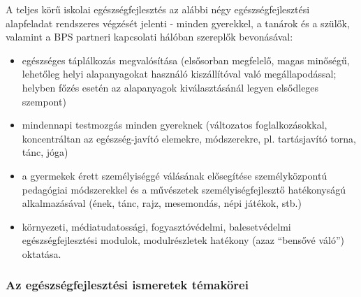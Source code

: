 A teljes körű iskolai egészségfejlesztés az alábbi négy
egészségfejlesztési alapfeladat rendszeres végzését jelenti - minden
gyerekkel, a tanárok és a szülők, valamint a BPS partneri kapcsolati
hálóban szereplők bevonásával:

\begin{itemize}

\item
  egészséges táplálkozás megvalósítása (elsősorban megfelelő, magas
  minőségű, lehetőleg helyi alapanyagokat használó kiszállítóval való
  megállapodással; helyben főzés esetén az alapanyagok kiválasztásánál
  legyen elsődleges szempont)
\item
  mindennapi testmozgás minden gyereknek (változatos foglalkozásokkal,
  koncentráltan az egészség-javító elemekre, módszerekre, pl.
  tartásjavító torna, tánc, jóga)
\item
  a gyermekek érett személyiséggé válásának elősegítése személyközpontú
  pedagógiai módszerekkel és a művészetek személyiségfejlesztő
  hatékonyságú alkalmazásával (ének, tánc, rajz, mesemondás, népi
  játékok, stb.)
\item
  környezeti, médiatudatossági, fogyasztóvédelmi, balesetvédelmi
  egészségfejlesztési modulok, modulrészletek hatékony (azaz ``bensővé
  váló'') oktatása.
\end{itemize}

\subsubsection{Az egészségfejlesztési ismeretek
témakörei}\label{az-eguxe9szsuxe9gfejlesztuxe9si-ismeretek-tuxe9makuxf6rei}

